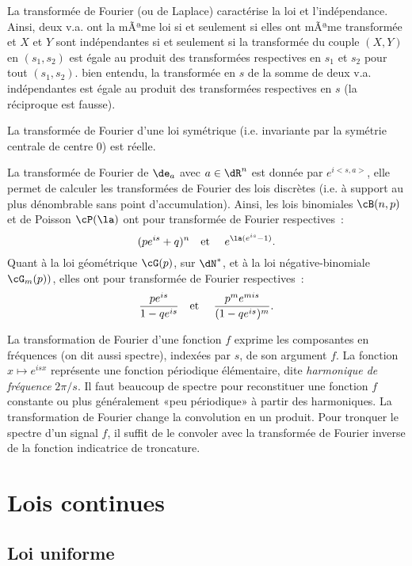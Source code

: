 {{La transformée de Fourier (ou de Laplace) caractérise la loi et
l'indépendance. Ainsi, deux v.a. ont la mÃªme loi si et seulement si elles ont
mÃªme transformée et $X$ et $Y$ sont indépendantes si et seulement si la
transformée du couple $(X,Y)$ en $(s_1,s_2)$ est égale au produit des
transformées respectives en $s_1$ et $s_2$ pour tout $(s_1,s_2)$. bien
entendu, la transformée en $s$ de la somme de deux v.a. indépendantes est
égale au produit des transformées respectives en $s$ (la réciproque est
fausse).

La transformée de Fourier d'une loi symétrique (i.e. invariante par la
symétrie centrale de centre $0$) est réelle.

La transformée de Fourier de $\de_a$ avec $a\in\dR^n$ est donnée par
$e^{i<s,a>}$, elle permet de calculer les transformées de Fourier des lois
discrètes (i.e. à support au plus dénombrable sans point d'accumulation).
Ainsi, les lois binomiales $\cB(n,p)$ et de Poisson $\cP(\la)$ ont pour
transformée de Fourier respectives~:
$$
(pe^{is}+q)^n
\text{\quad et \quad}
e^{\la(e^{is}-1)}.
$$
Quant à la loi géométrique $\cG(p)$, sur $\dN^*$, et à la loi
négative-binomiale $\cG_m(p))$, elles ont pour transformée de Fourier
respectives~:
$$
\frac{pe^{is}}{1-qe^{is}}
\text{\quad et \quad}
\frac{p^me^{mis}}{(1-qe^{is})^m}.
$$

\begin{eur}[Transformation de Fourier = analyse en fréquences]
  La transformation de Fourier d'une fonction $f$ exprime les composantes en
  fréquences (on dit aussi spectre), indexées par $s$, de son argument $f$.
  La fonction $x\mapsto e^{isx}$ représente une fonction périodique
  élémentaire, dite \emph{harmonique de fréquence} $2\pi/s$. Il faut beaucoup
  de spectre pour reconstituer une fonction $f$ constante ou plus généralement
  «peu périodique» à partir des harmoniques.  La transformation de Fourier
  change la convolution en un produit.  Pour tronquer le spectre d'un signal
  $f$, il suffit de le convoler avec la transformée de Fourier inverse de la
  fonction indicatrice de troncature.
\end{eur}

%
\section{Lois continues}
%

%
\subsection{Loi uniforme}\label{ss:loi:uniforme}
%

}}
